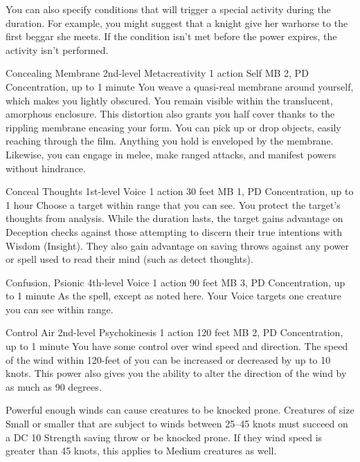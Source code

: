 You can also specify conditions that will trigger
a special activity during the duration.
For example, you might suggest that a knight
give her warhorse to the first beggar she meets.
If the condition isn't met before the power expires,
the activity isn't performed.

\DndPowerHeader%
  {Concealing Membrane}
  {2nd-level Metacreativity}
  {1 action}
  {Self}
  {MB 2, PD \lvltwo}
  {Concentration, up to 1 minute}
You weave a quasi-real membrane around yourself,
which makes you lightly obscured.
You remain visible within the translucent, amorphous enclosure.
This distortion also grants you half cover
thanks to the rippling membrane encasing your form.
You can pick up or drop objects, easily reaching through the film.
Anything you hold is enveloped by the membrane.
Likewise, you can engage in melee, make ranged attacks,
and manifest powers without hindrance.

\DndPowerHeader%
  {Conceal Thoughts}
  {1st-level Voice}
  {1 action}
  {30 feet}
  {MB 1, PD \lvlone}
  {Concentration, up to 1 hour}
Choose a target within range that you can see.
You protect the target's thoughts from analysis.
While the duration lasts, the target gains advantage on
Deception checks against those attempting to discern their
true intentions with Wisdom (Insight).
They also gain advantage on saving throws
against any power or spell
used to read their mind (such as detect thoughts).

\DndPowerHeader%
  {Confusion, Psionic}
  {4th-level Voice}
  {1 action}
  {90 feet}
  {MB 3, PD \lvlfour}
  {Concentration, up to 1 minute}
As the  spell, except as noted here.
Your Voice targets one creature you can see within range.

\DndPowerHeader%
  {Control Air}
  {2nd-level Psychokinesis}
  {1 action}
  {120 feet}
  {MB 2, PD \lvltwo}
  {Concentration, up to 1 minute}
You have some control over wind speed and direction.
The speed of the wind within 120-feet of you
can be increased or decreased by up to 10 knots.
This power also gives you the ability to alter the direction
of the wind by as much as 90 degrees.

Powerful enough winds can cause creatures to be knocked prone.
Creatures of size Small or smaller that are subject
to winds between 25--45 knots
must succeed on a DC 10 Strength saving throw or be knocked prone.
If they wind speed is greater than 45 knots,
this applies to Medium creatures as well.

